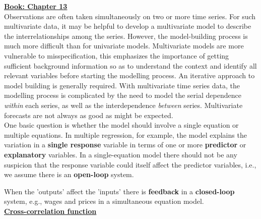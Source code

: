 \textbf{\underline{Book: Chapter 13}}\\

Observations are often taken simultaneously on two or more time series. For such multivariate data, it may be helpful to develop a multivariate model to describe the interrelationships among the series. However, the model-building process is much more difficult than for univariate models. Multivariate models are more vulnerable to misspecification, this emphasizes the importance of getting sufficient background information so as to understand the context and identify all relevant variables before starting the modelling process. An iterative approach to model building is generally required. With multivariate time series data, the modelling process is complicated by the need to model the serial dependence \textit{within} each series, as well as the interdependence \textit{between} series. Multivariate forecasts are not always as good as might be expected.\\

One basic question is whether the model should involve a single equation or multiple equations. In multiple regression, for example, the model explains the variation in a \textbf{single response} variable in terms of one or more \textbf{predictor} or \textbf{explanatory} variables. In a single-equation model there should not be any suspicion that the response variable could itself affect the predictor variables, i.e., we assume there is an \textbf{open-loop} system. \

When the 'outputs' affect the 'inputs' there is \textbf{feedback} in a \textbf{closed-loop} system, e.g., wages and prices in a simultaneous equation model. \\


\textbf{\underline{Cross-correlation function}}\\

